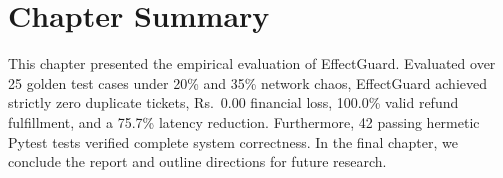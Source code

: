 \section{Chapter Summary}

This chapter presented the empirical evaluation of EffectGuard. Evaluated over 25 golden test cases under 20\% and 35\% network chaos, EffectGuard achieved strictly zero duplicate tickets, Rs.~0.00 financial loss, 100.0\% valid refund fulfillment, and a 75.7\% latency reduction. Furthermore, 42 passing hermetic Pytest tests verified complete system correctness. In the final chapter, we conclude the report and outline directions for future research.
